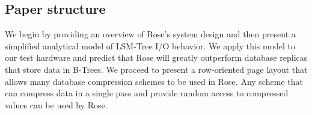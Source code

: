 \documentclass{vldb}
\newcommand{\rows}{Rose\xspace}
\newcommand{\rowss}{Rose's\xspace}
\begin{document}





\subsection{Paper structure}

We begin by providing an overview of \rowss system design and then
present a simplified analytical model of LSM-Tree I/O behavior.  We
apply this model to our test hardware and predict that \rows will
greatly outperform database replicas that store data in B-Trees.  We
proceed to present a row-oriented page layout that allows many
database compression schemes to be used in \rows.  Any scheme that can
compress data in a single pass and provide random access to compressed
values can be used by \rows.
\end{document}
